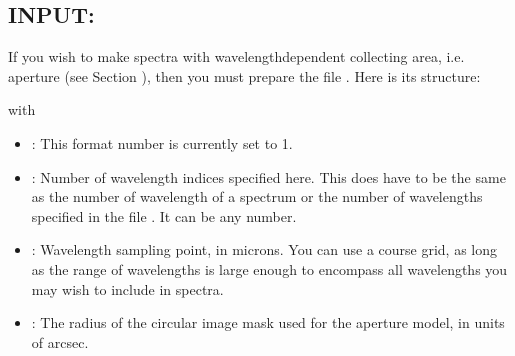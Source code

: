 \documentclass[letterpaper,10pt,english]{sphinxmanual}
\begin{document}
\subsection{INPUT: }
\label{\detokenize{inputoutputfiles:input-aperture-info-inp}}\label{\detokenize{inputoutputfiles:sec-aperture-info-file}}
If you wish to make spectra with wavelength\sphinxhyphen{}dependent collecting area, i.e.
aperture (see Section {\hyperref[\detokenize{imagesspectra:sec-aperture}]{}}), then you must prepare the file
. Here is its structure:

\begin{sphinxVerbatim}[commandchars=\\\{\}]
                           
\PYG{p}{[}\PYG{p}{]}      \PYG{p}{[}\PYG{p}{]}
              
              
\PYG{p}{[}\PYG{p}{]}   \PYG{p}{[}\PYG{p}{]}
\end{sphinxVerbatim}

with
\begin{itemize}
\item {} 
: This format number is currently set to 1.

\item {} 
: Number of wavelength indices specified here. This
does  have to be the same as the number of wavelength of a
spectrum or the number of wavelengths specified in the file
. It can be any number.

\item {} 
: Wavelength sampling point, in microns. You can use
a course grid, as long as the range of wavelengths is large enough to
encompass all wavelengths you may wish to include in spectra.

\item {} 
: The radius of the circular image mask used for
the aperture model, in units of arcsec.

\end{itemize}
\end{document}
